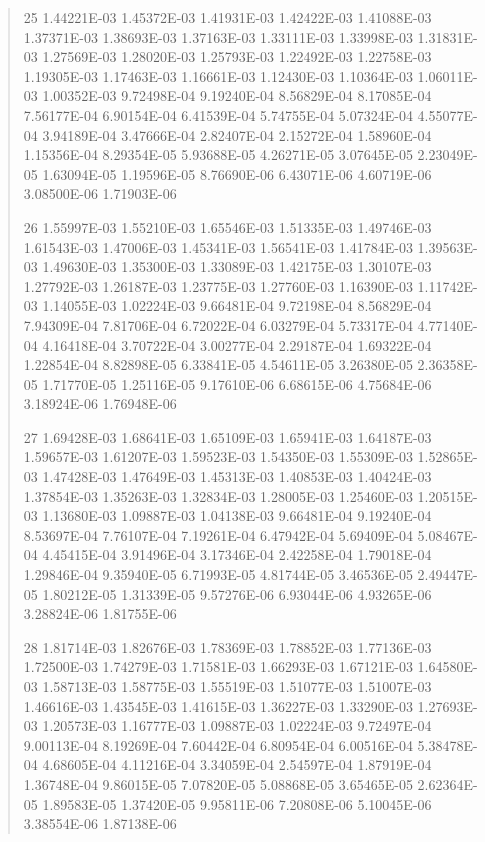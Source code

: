 \documentclass[letterpaper,10pt,english]{sphinxmanual}
\begin{document}
\begin{quote}
\begin{DUlineblock}{0em}
\item[] 25   1.44221E-03  1.45372E-03  1.41931E-03  1.42422E-03  1.41088E-03  1.37371E-03  1.38693E-03  1.37163E-03  1.33111E-03  1.33998E-03  1.31831E-03  1.27569E-03  1.28020E-03  1.25793E-03  1.22492E-03  1.22758E-03  1.19305E-03  1.17463E-03  1.16661E-03  1.12430E-03  1.10364E-03  1.06011E-03  1.00352E-03  9.72498E-04  9.19240E-04  8.56829E-04  8.17085E-04  7.56177E-04  6.90154E-04  6.41539E-04  5.74755E-04  5.07324E-04  4.55077E-04  3.94189E-04  3.47666E-04  2.82407E-04  2.15272E-04  1.58960E-04  1.15356E-04  8.29354E-05  5.93688E-05  4.26271E-05  3.07645E-05  2.23049E-05  1.63094E-05  1.19596E-05  8.76690E-06  6.43071E-06  4.60719E-06  3.08500E-06  1.71903E-06
\item[] 26   1.55997E-03  1.55210E-03  1.65546E-03  1.51335E-03  1.49746E-03  1.61543E-03  1.47006E-03  1.45341E-03  1.56541E-03  1.41784E-03  1.39563E-03  1.49630E-03  1.35300E-03  1.33089E-03  1.42175E-03  1.30107E-03  1.27792E-03  1.26187E-03  1.23775E-03  1.27760E-03  1.16390E-03  1.11742E-03  1.14055E-03  1.02224E-03  9.66481E-04  9.72198E-04  8.56829E-04  7.94309E-04  7.81706E-04  6.72022E-04  6.03279E-04  5.73317E-04  4.77140E-04  4.16418E-04  3.70722E-04  3.00277E-04  2.29187E-04  1.69322E-04  1.22854E-04  8.82898E-05  6.33841E-05  4.54611E-05  3.26380E-05  2.36358E-05  1.71770E-05  1.25116E-05  9.17610E-06  6.68615E-06  4.75684E-06  3.18924E-06  1.76948E-06
\item[] 27   1.69428E-03  1.68641E-03  1.65109E-03  1.65941E-03  1.64187E-03  1.59657E-03  1.61207E-03  1.59523E-03  1.54350E-03  1.55309E-03  1.52865E-03  1.47428E-03  1.47649E-03  1.45313E-03  1.40853E-03  1.40424E-03  1.37854E-03  1.35263E-03  1.32834E-03  1.28005E-03  1.25460E-03  1.20515E-03  1.13680E-03  1.09887E-03  1.04138E-03  9.66481E-04  9.19240E-04  8.53697E-04  7.76107E-04  7.19261E-04  6.47942E-04  5.69409E-04  5.08467E-04  4.45415E-04  3.91496E-04  3.17346E-04  2.42258E-04  1.79018E-04  1.29846E-04  9.35940E-05  6.71993E-05  4.81744E-05  3.46536E-05  2.49447E-05  1.80212E-05  1.31339E-05  9.57276E-06  6.93044E-06  4.93265E-06  3.28824E-06  1.81755E-06
\item[] 28   1.81714E-03  1.82676E-03  1.78369E-03  1.78852E-03  1.77136E-03  1.72500E-03  1.74279E-03  1.71581E-03  1.66293E-03  1.67121E-03  1.64580E-03  1.58713E-03  1.58775E-03  1.55519E-03  1.51077E-03  1.51007E-03  1.46616E-03  1.43545E-03  1.41615E-03  1.36227E-03  1.33290E-03  1.27693E-03  1.20573E-03  1.16777E-03  1.09887E-03  1.02224E-03  9.72497E-04  9.00113E-04  8.19269E-04  7.60442E-04  6.80954E-04  6.00516E-04  5.38478E-04  4.68605E-04  4.11216E-04  3.34059E-04  2.54597E-04  1.87919E-04  1.36748E-04  9.86015E-05  7.07820E-05  5.08868E-05  3.65465E-05  2.62364E-05  1.89583E-05  1.37420E-05  9.95811E-06  7.20808E-06  5.10045E-06  3.38554E-06  1.87138E-06

\end{DUlineblock}
\end{quote}
\end{document}
